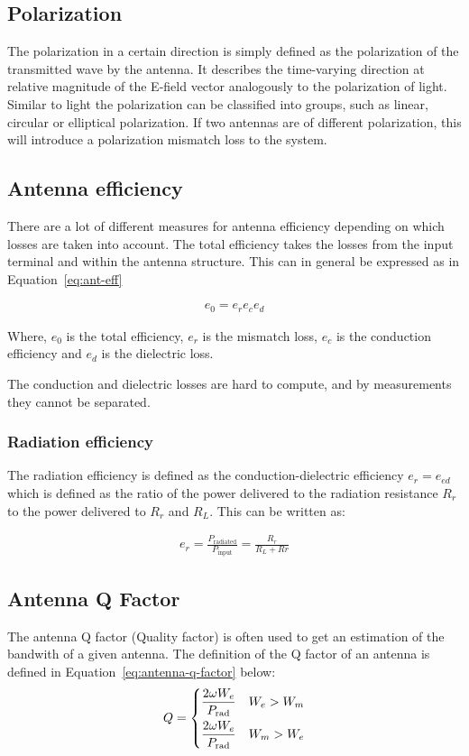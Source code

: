 \subsection{Polarization}
The polarization in a certain direction is simply defined as the polarization of the transmitted wave by the antenna. It describes the time-varying direction at relative magnitude of the E-field vector analogously to the polarization of light. Similar to light the polarization can be classified into groups, such as linear, circular or elliptical polarization. If two antennas are of different polarization, this will introduce a polarization mismatch loss to the system. 

\subsection{Antenna efficiency}
There are a lot of different measures for antenna efficiency depending on which losses are taken into account. The total efficiency takes the losses from the input terminal and within the antenna structure. This can in general be expressed as in Equation~\ref{eq:ant-eff}

\begin{align}
\label{eq:ant-eff}
  e_0 = e_r e_c e_d
\end{align}

Where, $e_0$ is the total efficiency, $e_r$ is the mismatch loss, $e_c$ is the conduction efficiency and $e_d$ is the dielectric loss. 

The conduction and dielectric losses are hard to compute, and by measurements they cannot be separated. 

\subsubsection{Radiation efficiency}
The radiation efficiency is defined as the conduction-dielectric efficiency $e_r = e_{ed}$ which is defined as the ratio of the power delivered to the radiation resistance $R_r$ to the power delivered to $R_r$ and $R_L$. This can be written as:


\begin{align}
  e_r = \frac{P_{\text{radiated}}}{P_{\text{input}}} = \frac{R_r}{R_L+Rr}
\end{align}

\subsection{Antenna Q Factor}
The antenna Q factor (Quality factor) is often used to get an estimation of the bandwith of a given antenna. The definition of the Q factor of an antenna is defined in Equation~\ref{eq:antenna-q-factor} below\cite{fundamentalMcLean}: 
\begin{align}
  \label{eq:antenna-q-factor}
      Q =
    \begin{dcases}
       \frac{2 \omega W_e}{P_{\text{rad}}} & W_e > W_m  \\
       \frac{2 \omega W_e}{P_{\text{rad}}} & W_m > W_e 
    \end{dcases}
\end{align}

